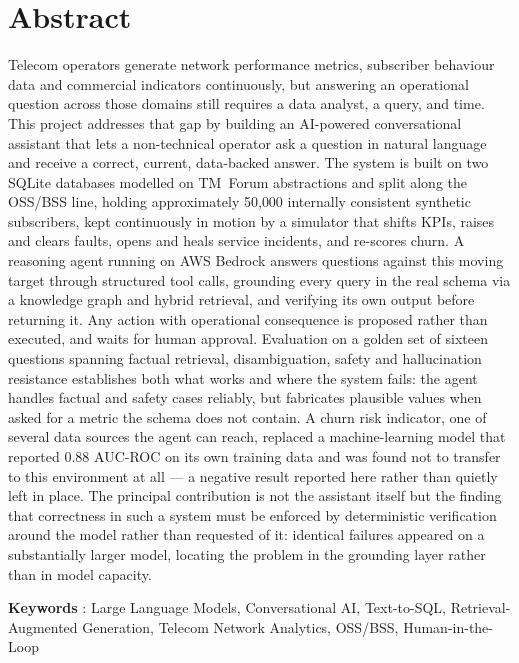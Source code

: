 \chapter*{Abstract}

\par Telecom operators generate network performance metrics, subscriber behaviour data
and commercial indicators continuously, but answering an operational question across
those domains still requires a data analyst, a query, and time. This project addresses
that gap by building an AI-powered conversational assistant that lets a non-technical
operator ask a question in natural language and receive a correct, current, data-backed
answer. The system is built on two SQLite databases modelled on TM~Forum abstractions
and split along the OSS/BSS line, holding approximately 50{,}000 internally consistent
synthetic subscribers, kept continuously in motion by a simulator that shifts KPIs,
raises and clears faults, opens and heals service incidents, and re-scores churn. A
reasoning agent running on AWS Bedrock answers questions against this moving target
through structured tool calls, grounding every query in the real schema via a knowledge
graph and hybrid retrieval, and verifying its own output before returning it. Any action
with operational consequence is proposed rather than executed, and waits for human
approval. Evaluation on a golden set of sixteen questions spanning factual retrieval,
disambiguation, safety and hallucination resistance establishes both what works and
where the system fails: the agent handles factual and safety cases reliably, but
fabricates plausible values when asked for a metric the schema does not contain. A churn
risk indicator, one of several data sources the agent can reach, replaced a
machine-learning model that reported 0.88 AUC-ROC on its own training data and was
found not to transfer to this environment at all --- a negative result reported here
rather than quietly left in place. The
principal contribution is not the assistant itself but the finding that correctness in
such a system must be enforced by deterministic verification around the model rather
than requested of it: identical failures appeared on a substantially larger model,
locating the problem in the grounding layer rather than in model capacity.

{\large \textbf{Keywords} : }Large Language Models, Conversational AI, Text-to-SQL,
Retrieval-Augmented Generation, Telecom Network Analytics, OSS/BSS, Human-in-the-Loop

\newpage
